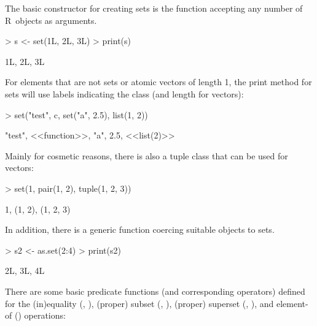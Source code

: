 \documentclass[article]{jss}
\newcommand\R{\textsf{R}}
\newcommand{\codefun}[1]{\code{#1()}}
\newcommand{\codefunind}[1]{\codefun{#1}\index{\texttt{#1}}}
\begin{document}
The basic constructor for creating sets is the \codefunind{set}
function accepting any number of \R{}~objects as arguments.
\begin{Schunk}
\begin{Sinput}
> s <- set(1L, 2L, 3L)
> print(s)
\end{Sinput}
\begin{Soutput}
{1L, 2L, 3L}
\end{Soutput}
\end{Schunk}
For elements that are not sets or atomic vectors of length 1, the
print method for sets will use labels indicating the class (and
length for vectors):
\begin{Schunk}
\begin{Sinput}
> set("test", c, set("a", 2.5), list(1, 2))
\end{Sinput}
\begin{Soutput}
{"test", <<function>>, {"a", 2.5}, <<list(2)>>}
\end{Soutput}
\end{Schunk}
Mainly for cosmetic reasons, there is also a tuple class that can be
used for vectors:
\begin{Schunk}
\begin{Sinput}
> set(1, pair(1, 2), tuple(1, 2, 3))
\end{Sinput}
\begin{Soutput}
{1, (1, 2), (1, 2, 3)}
\end{Soutput}
\end{Schunk}
In addition, there is a generic \codefunind{as.set}
function coercing suitable objects to sets.
\begin{Schunk}
\begin{Sinput}
> s2 <- as.set(2:4)
> print(s2)
\end{Sinput}
\begin{Soutput}
{2L, 3L, 4L}
\end{Soutput}
\end{Schunk}
There are some basic predicate functions (and corresponding operators)
defined for the (in)equality (\code{!=}, \code{==}),
(proper) subset (\code{<}, \code{<=}), (proper) superset (\code{>},
\code{>=}), and element-of () operations:
\end{document}
